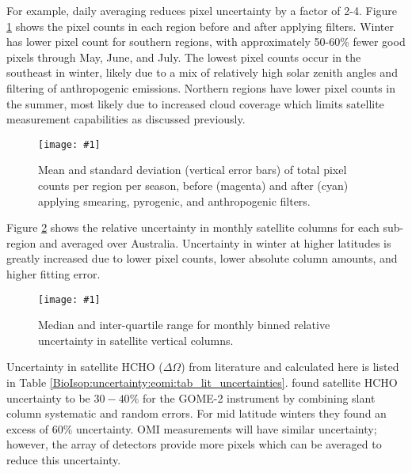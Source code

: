 \documentclass[acp, manuscript]{copernicus}
\newcommand{\textcite}{\citet}
\newcommand{\highhr}{$0.25^{\circ} \times 0.3125^{\circ}$}
\newcommand{\mypic}[3]{%
  \begin{figure}
    \texttt{[image: \#1]}
    \caption{#2}
    #3
  \end{figure}
}
\begin{document}
    For example, daily averaging reduces pixel uncertainty by a factor of 2-4.
    Figure \ref{BioIsop:uncertainty:satellite:fig_pixel_count_summary} shows the pixel counts in each region before and after applying filters.
    Winter has lower pixel count for southern regions, with approximately 50-60\% fewer good pixels through May, June, and July.
    The lowest pixel counts occur in the southeast in winter, likely due to a mix of relatively high solar zenith angles and filtering of anthropogenic emissions.
    Northern regions have lower pixel counts in the summer, most likely due to increased cloud coverage which limits satellite measurement capabilities as discussed previously.
    
    \mypic{Figures/pixel_count_barchart_unfiltered.png}{%
      Mean and standard deviation (vertical error bars) of total pixel counts per region per season, before (magenta) and after (cyan) applying smearing, pyrogenic, and anthropogenic filters.
    }{\label{BioIsop:uncertainty:satellite:fig_pixel_count_summary}}
    
    
    
    Figure \ref{BioIsop:uncertainty:satellite:fig_Orerrsummary} shows the relative uncertainty in monthly satellite columns for each sub-region and averaged over Australia.
    Uncertainty in winter at higher latitudes is greatly increased due to lower pixel counts, lower absolute column amounts, and higher fitting error.
    
    \mypic{Figures/mya_Orerr.png}{%
      Median and inter-quartile range for monthly binned relative uncertainty in satellite vertical columns.
    }{\label{BioIsop:uncertainty:satellite:fig_Orerrsummary}}
    
    
    
    Uncertainty in satellite HCHO ($\Delta{\Omega}$) from literature and calculated here is listed in Table \ref{BioIsop:uncertainty:eomi:tab_lit_uncertainties}.
    \textcite{DeSmedt2012} found satellite HCHO uncertainty to be $30-40\%$ for the GOME-2 instrument by combining slant column systematic and random errors.
    For mid latitude winters they found an excess of 60\% uncertainty.
    OMI measurements will have similar  uncertainty; however, the array of detectors provide more pixels which can be averaged to reduce this uncertainty.
    
\end{document}
